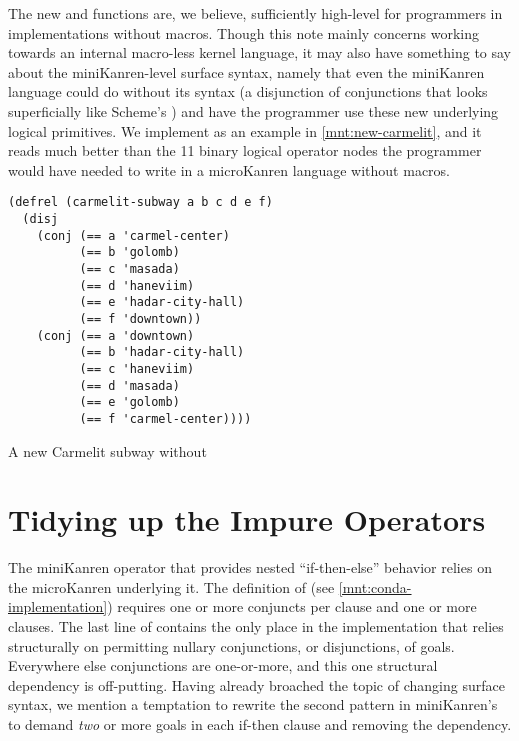 \documentclass[sigplan,balance,pbalance,natbib=false]{acmart}
\begin{document}
The new  and  functions are, we
believe, sufficiently high-level for programmers in implementations
without macros. Though this note mainly concerns working towards an
internal macro-less kernel language, it may also have something to say
about the miniKanren-level surface syntax, namely that even the
miniKanren language could do without its  syntax (a
disjunction of conjunctions that looks superficially like
Scheme's ) and have the programmer use these new
underlying logical primitives. We
implement  as an example in
\cref{mnt:new-carmelit}, and it reads much better than the 11 binary
logical operator nodes the programmer would have needed to write in a
microKanren language without macros.

\begin{listing}[h]
  \begin{verbatim}
(defrel (carmelit-subway a b c d e f)
  (disj
    (conj (== a 'carmel-center)
          (== b 'golomb)
          (== c 'masada)
          (== d 'haneviim)
          (== e 'hadar-city-hall)
          (== f 'downtown))
    (conj (== a 'downtown)
          (== b 'hadar-city-hall)
          (== c 'haneviim)
          (== d 'masada)
          (== e 'golomb)
          (== f 'carmel-center))))
  \end{verbatim}
  \caption{A new Carmelit subway without }\label{mnt:new-carmelit}
\end{listing}

\section{Tidying up the Impure Operators}\label{sec:impure}

The miniKanren  operator that provides nested
\enquote{if-then-else} behavior relies on the
microKanren  underlying it. The definition
of  (see \cref{mnt:conda-implementation}) requires
one or more conjuncts per clause and one or more clauses. The last
line of  contains the only place in the
implementation that relies structurally on permitting nullary
conjunctions, or disjunctions, of goals. Everywhere else conjunctions
are one-or-more, and this one structural dependency is off-putting.
Having already broached the topic of changing surface syntax, we
mention a temptation to rewrite the second pattern in
miniKanren's  to demand \emph{two} or more goals in
each if-then clause and removing the dependency.
\end{document}
